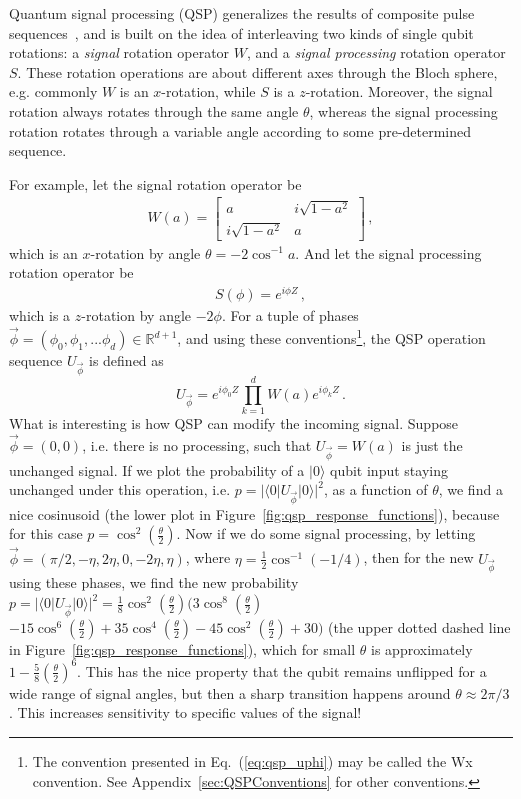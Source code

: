 \documentclass[aps,pra,showpacs,notitlepage,twocolumn,superscriptaddress,nofootinbib]{revtex4-1}
\def\>{\rangle}
\def\<{\langle}
\newcommand{\bea}{\begin{eqnarray}}
\newcommand{\eea}{\end{eqnarray}}
\newcommand{\be}{\begin{equation}}
\newcommand{\ee}{\end{equation}}
\newcommand{\mattwocb}[4]{\left[
	\begin{array}{cc}{#1}&{#2}\\{#3}&{#4}\end{array}\right]}
\begin{document}
Quantum signal processing (QSP) generalizes the results of composite pulse sequences~\cite{Low_2016, Low_2017, Low_2019}, and is built on the idea of interleaving two kinds of single qubit rotations: a {\em signal} rotation operator $W$, and a {\em signal processing} rotation operator $S$.  These rotation operations are about different axes through the Bloch sphere, e.g. commonly $W$ is an $x$-rotation, while $S$ is a $z$-rotation.  Moreover, the signal rotation always rotates through the same angle $\theta$, whereas the signal processing rotation rotates through a variable angle according to some pre-determined sequence.

For example, let the signal rotation operator be
    \bea
        W(a) = \mattwocb{a}{i \sqrt{1-a^2}}{i \sqrt{1-a^2}}{a}\,,
        \label{eq:wa_qsp}
    \eea
which is an $x$-rotation by angle $\theta = -2\cos^{-1} a$. And let the signal processing rotation operator be
    \bea \label{eq:qsp_rotation}
        S(\phi) = e^{i \phi Z}\,,
    \eea
which is a $z$-rotation by angle $-2\phi$.  For a tuple of phases $\vec{\phi} = (\phi_0, \phi_1, ... \phi_d) \in \mathbb{R}^{d+1}$, and using these conventions\footnote{The convention presented in Eq.~(\ref{eq:qsp_uphi}) may be called the Wx convention. See Appendix~\ref{sec:QSPConventions} for other conventions.}, the QSP operation sequence $U_{\vec\phi}$ is defined as
    \be
        U_{\vec\phi} = e^{i \phi_0 Z} \prod_{k=1}^d  W(a)  e^{i\phi_k Z}
        \label{eq:qsp_uphi}
        \,.
    \ee
 What is interesting is how QSP can modify the incoming signal. Suppose $\vec{\phi} = (0,0)$, i.e. there is no processing, such that $U_{\vec{\phi}} = W(a)$ is just the unchanged signal.  If we plot the probability of a $|0\>$ qubit input staying unchanged under this operation, i.e. $p = |\<0|U_{\vec{\phi}}|0\>|^2$, as a function of $\theta$, we find a nice cosinusoid (the lower plot in Figure~\ref{fig:qsp_response_functions}), because for this case $p = \cos^2\left(\frac{\theta}{2}\right)$.  Now if we do some signal processing, by letting $\vec{\phi} = (\pi/2, -\eta, 2\eta, 0, -2\eta, \eta)$, where $\eta = \frac{1}{2} \cos^{-1}\left(-1/4\right)$, then for the new $U_{\vec{\phi}}$ using these phases, we find the new probability $p = |\<0|U_{\vec{\phi}}|0\>|^2 = \frac{1}{8} \cos^2\left(\frac{\theta}{2}\right) \Big(3 \cos^8\left(\frac{\theta}{2}\right)$ $- 15 \cos^6\left(\frac{\theta}{2}\right) +35 \cos^4\left(\frac{\theta}{2}\right) - 45 \cos^2\left(\frac{\theta}{2}\right) + 30\Big)$ (the upper dotted dashed line in Figure~\ref{fig:qsp_response_functions}), which for small $\theta$ is approximately $1-\frac{5}{8}\left( \frac{\theta}{2}\right)^6$. This has the nice property that the qubit remains unflipped for a wide range of signal angles, but then a sharp transition happens around $\theta\approx 2\pi/3$. This increases sensitivity to specific values of the signal! 
\end{document}
